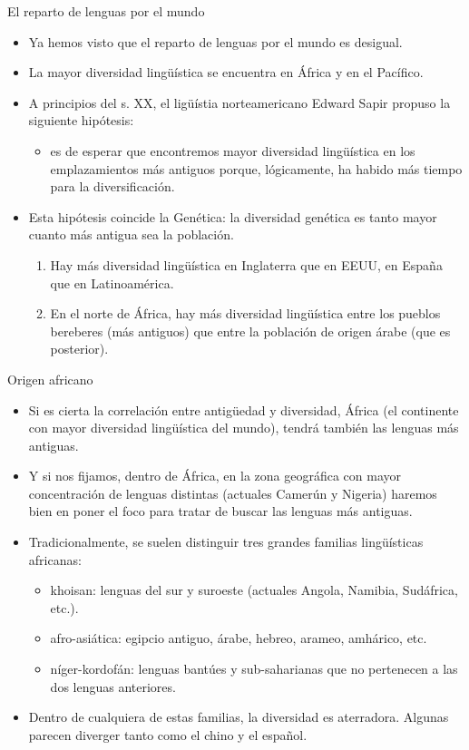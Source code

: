 \documentclass[handout]{beamer}
\begin{document}
\begin{frame}{El reparto de lenguas por el mundo}
\begin{itemize}
	\item Ya hemos visto que el reparto de lenguas por el mundo es desigual.
	\item La mayor diversidad lingüística se encuentra en África y en el Pacífico.
	\item A principios del s. XX, el ligüístia norteamericano Edward Sapir propuso la siguiente hipótesis:
	\begin{itemize}
		\item es de esperar que encontremos mayor diversidad lingüística en los emplazamientos más antiguos porque, lógicamente, ha habido más tiempo para la diversificación. 
	\end{itemize}
	\item Esta hipótesis coincide la Genética: la diversidad genética es tanto mayor cuanto más antigua sea la población.
	\begin{enumerate} 
		\item Hay más diversidad lingüística en Inglaterra que en EEUU, en España que en Latinoamérica.
		\item En el norte de África, hay más diversidad lingüística entre los pueblos bereberes (más antiguos) que entre la población de origen árabe (que es posterior).
	\end{enumerate} 
\end{itemize}
\end{frame}

\begin{frame}{Origen africano}
\begin{itemize}
	\item Si es cierta la correlación entre antigüedad y diversidad, África (el continente con mayor diversidad lingüística del mundo), tendrá también las lenguas más antiguas.
	\item Y si nos fijamos, dentro de África, en la zona geográfica con mayor concentración de lenguas distintas (actuales Camerún y Nigeria) haremos bien en poner el foco para tratar de buscar las lenguas más antiguas.
	\item Tradicionalmente, se suelen distinguir tres grandes familias lingüísticas africanas:
	\begin{itemize}
		\item khoisan: lenguas del sur y suroeste (actuales Angola, Namibia, Sudáfrica, etc.).
		\item afro-asiática: egipcio antiguo, árabe, hebreo, arameo, amhárico, etc.
		\item níger-kordofán: lenguas bantúes y sub-saharianas que no pertenecen a las dos lenguas anteriores.
	\end{itemize}
	\item Dentro de cualquiera de estas familias, la diversidad es aterradora. Algunas parecen diverger tanto como el chino y el español.
\end{itemize}
\end{frame}
\end{document}
